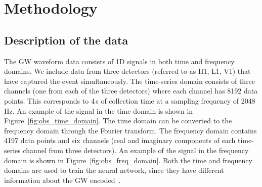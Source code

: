 \section{Methodology}
\label{sec:methodology}

\subsection{Description of the data}

The GW waveform data consists of 1D signals in both time and frequency domains. We include data from three detectors (referred to as H1, L1, V1) that have captured the event simultaneously. The time-series domain consists of three channels (one from each of the three detectors) where each channel has 8192 data points. This corresponds to 4\,s of collection time at a sampling frequency of 2048\,Hz. An example of the signal in the time domain is shown in Figure~\ref{fig:obs_time_domain}. The time domain can be converted to the frequency domain through the Fourier transform. The frequency domain contains 4197 data points and six channels (real and imaginary components of each time-series channel from three detectors). An example of the signal in the frequency domain is shown in Figure~\ref{fig:obs_freq_domain}. Both the time and frequency domains are used to train the neural network, since they have different information about the GW encoded~\cite{bhardwaj2023peregrine}. 

